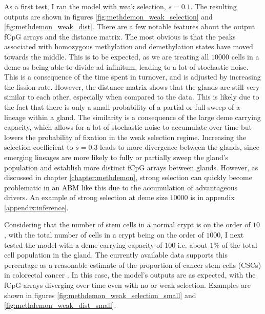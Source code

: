 As a first test, I ran the model with weak selection, $s=0.1$. The resulting
outputs are shown in figures \ref{fig:methdemon_weak_selection} and
\ref{fig:methdemon_weak_dist}. There are a few notable features about the
output fCpG arrays and the distance matrix. The most obvious is that the peaks
associated with homozygous methylation and demethylation states have moved
towards the middle. This is to be expected, as we are treating all $10000$ cells
in a deme as being able to divide ad infinitum, leading to a lot of stochastic
noise. This is a consequence of the time spent in turnover, and is adjusted by
increasing the fission rate. However, the distance matrix shows that the glands
are still very similar to each other, especially when compared to the data. This
is likely due to the fact that there is only a small probability of a partial or
full sweep of a lineage within a gland. The similarity is a consequence of the
large deme carrying capacity, which allows for a lot of stochastic noise to
accumulate over time but lowers the probability of fixation in the weak
selection regime. Increasing the selection coefficient to $s=0.3$ leads to more
divergence between the glands, since emerging lineages are more likely to fully
or partially sweep the gland's population and establish more distinct fCpG
arrays between glands. However, as discussed in chapter \ref{chapter:methdemon},
strong selection can quickly become problematic in an ABM like this due to the
accumulation of advantageous drivers. An example of strong selection at deme
size $10000$ is in appendix \ref{appendix:inference}. \par
Considering that the number of stem cells in a normal crypt is on the order of
$10$ \cite{gehart_tales_2019, gabbutt_fluctuating_2022}, with the total number
of cells in a crypt being on the order of $1000$, I next tested the model with
a deme carrying capacity of $100$ i.e. about $1\%$ of the total cell population
in the gland. The currently available data supports this percentage as a
reasonable estimate of the proportion of cancer stem cells (CSCs) in colorectal
cancer \cite{obrien_human_2007, munro_cancer_2018}. In this case, the model's
outputs are as expected, with the fCpG arrays diverging over time even with no
or weak selection. Examples are shown in figures
\ref{fig:methdemon_weak_selection_small} and
\ref{fig:methdemon_weak_dist_small}.

